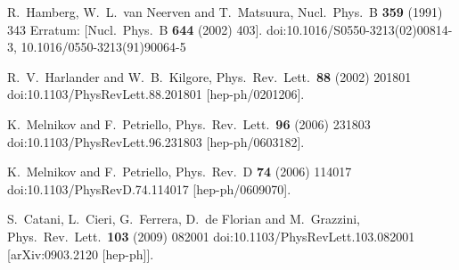 


  R.~Hamberg, W.~L.~van Neerven and T.~Matsuura,
  Nucl.\ Phys.\ B {\bf 359} (1991) 343
   Erratum: [Nucl.\ Phys.\ B {\bf 644} (2002) 403].
  doi:10.1016/S0550-3213(02)00814-3, 10.1016/0550-3213(91)90064-5

  R.~V.~Harlander and W.~B.~Kilgore,
  Phys.\ Rev.\ Lett.\  {\bf 88} (2002) 201801
  doi:10.1103/PhysRevLett.88.201801
  [hep-ph/0201206].



  K.~Melnikov and F.~Petriello,
  Phys.\ Rev.\ Lett.\  {\bf 96} (2006) 231803
  doi:10.1103/PhysRevLett.96.231803
  [hep-ph/0603182].

  K.~Melnikov and F.~Petriello,
  Phys.\ Rev.\ D {\bf 74} (2006) 114017
  doi:10.1103/PhysRevD.74.114017
  [hep-ph/0609070].

  S.~Catani, L.~Cieri, G.~Ferrera, D.~de Florian and M.~Grazzini,
  Phys.\ Rev.\ Lett.\  {\bf 103} (2009) 082001
  doi:10.1103/PhysRevLett.103.082001
  [arXiv:0903.2120 [hep-ph]].

